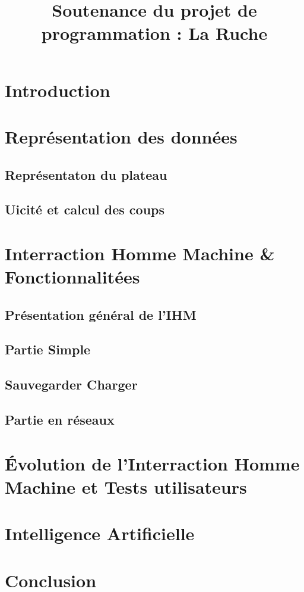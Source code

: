 \documentclass{beamer}
\title{Soutenance du projet de programmation : La Ruche}
\begin{document}
\section{Introduction}%


\section{Repr\'esentation des donn\'ees}%
    \subsection{Repr\'esentaton du plateau}
    \subsection{Uicit\'e et calcul des coups}




\section{Interraction Homme Machine \& Fonctionnalit\'ees}%
    \subsection{Pr\'esentation g\'en\'eral de l'IHM}%
    \subsection{Partie Simple}%
    \subsection{Sauvegarder Charger}%
    \subsection{Partie en r\'eseaux}%
    
    


    
\section{\'Evolution de l'Interraction Homme Machine et Tests utilisateurs}%




\section{Intelligence Artificielle}%




\section{Conclusion}%
\end{document}
